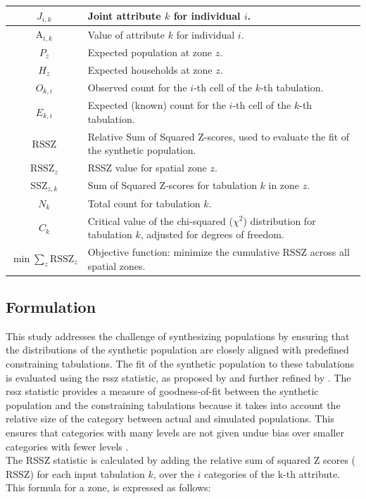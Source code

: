 \begin{longtable}{|c|p{10cm}|}
\( J_{i,k} \) & Joint attribute \( k \) for individual \( i \). \\ \hline
\( \text{A}_{i,k} \) & Value of attribute \( k \) for individual \( i \). \\ \hline
\( P_z \) & Expected population at zone \( z \). \\ \hline
\( H_z \) & Expected households at zone \( z \). \\ \hline
\( O_{k,i} \) & Observed count for the \( i \)-th cell of the \( k \)-th tabulation. \\ \hline
\( E_{k,i} \) & Expected (known) count for the \( i \)-th cell of the \( k \)-th tabulation. \\ \hline
\( \text{RSSZ} \) & Relative Sum of Squared Z-scores, used to evaluate the fit of the synthetic population. \\ \hline
\( \text{RSSZ}_z \) & RSSZ value for spatial zone \( z \). \\ \hline
\( \text{SSZ}_{z,k} \) &  Sum of Squared Z-scores for tabulation \( k \) in zone \( z \). \\ \hline
\( N_k \) & Total count for tabulation \( k \). \\ \hline
\( C_k \) & Critical value of the chi-squared (\( \chi^2 \)) distribution for tabulation \( k \), adjusted for degrees of freedom. \\ \hline
\( \min \sum_{z} \text{RSSZ}_z \) & Objective function: minimize the cumulative RSSZ across all spatial zones. \\ \hline

\end{longtable}

\FloatBarrier
\subsection{Formulation}
This study addresses the challenge of synthesizing populations by ensuring that the distributions of the synthetic population are closely aligned with predefined constraining tabulations. The fit of the synthetic population to these tabulations is evaluated using the \gls{rssz} statistic, as proposed by \cite{Voas2001EvaluatingMicrodata} and further refined by \cite{Huang2001AMicrodata.}. The \gls{rssz} statistic provides a measure of goodness-of-fit between the synthetic population and the constraining tabulations because it takes into account the relative size of the category between actual and simulated populations. This ensures that categories with many levels are not given undue bias over smaller categories with fewer levels \citep{Rahman2023PopulationTechnique}. 
\\
The RSSZ statistic is calculated by adding the relative sum of squared Z scores (\( \text{RSSZ} \)) for each input tabulation \( k \), over the \(i\) categories of the k-th attribute. This formula for a zone, is expressed as follows:


